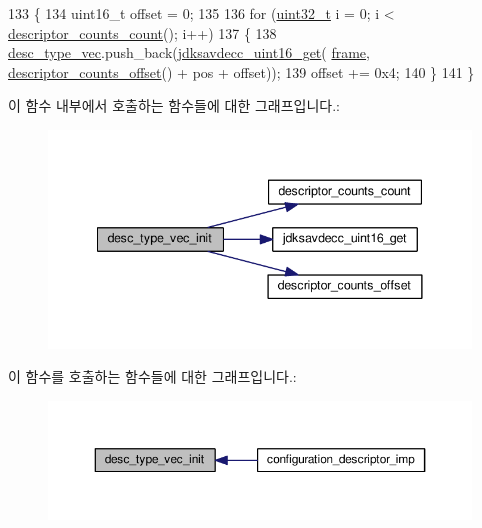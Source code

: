 \begin{DoxyCode}
133 \{
134     uint16\_t offset = 0;
135 
136     \textcolor{keywordflow}{for} (\hyperlink{parse_8c_a6eb1e68cc391dd753bc8ce896dbb8315}{uint32\_t} i = 0; i < \hyperlink{classavdecc__lib_1_1configuration__descriptor__imp_a2d700cbc2f59b626c8e24047a3604189}{descriptor\_counts\_count}(); i++)
137     \{
138         \hyperlink{classavdecc__lib_1_1configuration__descriptor__imp_a2b2c674b5d4ca35daefae2f7c998cce5}{desc\_type\_vec}.push\_back(\hyperlink{group__endian_ga3fbbbc20be954aa61e039872965b0dc9}{jdksavdecc\_uint16\_get}(
      \hyperlink{gst__avb__playbin_8c_ac8e710e0b5e994c0545d75d69868c6f0}{frame}, \hyperlink{classavdecc__lib_1_1configuration__descriptor__imp_ad334fc9cdf1a9094d61b0864b4317b10}{descriptor\_counts\_offset}() + pos + offset));
139         offset += 0x4;
140     \}
141 \}
\end{DoxyCode}


이 함수 내부에서 호출하는 함수들에 대한 그래프입니다.\+:
\nopagebreak
\begin{figure}[H]
\begin{center}
\leavevmode
\includegraphics[width=341pt]{classavdecc__lib_1_1configuration__descriptor__imp_a3e6b5d18a85f706ac26d2e242a561a96_cgraph}
\end{center}
\end{figure}




이 함수를 호출하는 함수들에 대한 그래프입니다.\+:
\nopagebreak
\begin{figure}[H]
\begin{center}
\leavevmode
\includegraphics[width=350pt]{classavdecc__lib_1_1configuration__descriptor__imp_a3e6b5d18a85f706ac26d2e242a561a96_icgraph}
\end{center}
\end{figure}


